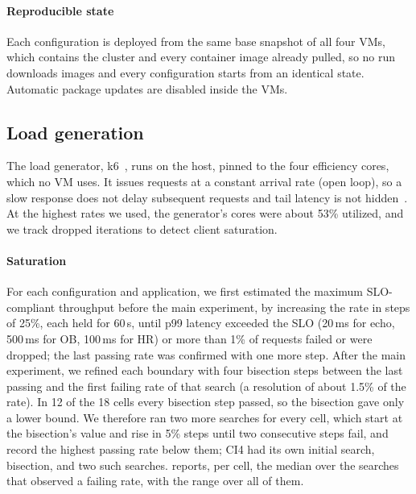 \paragraph{Reproducible state}
Each configuration is deployed from the same base snapshot of all four VMs,
which contains the cluster and every container image already pulled, so no run
downloads images and every configuration starts from an identical state.
Automatic package updates are disabled inside the VMs.

\subsection{Load generation}
\label{sec:load}

The load generator, k6~\cite{k6}, runs on the host, pinned to the four
efficiency cores, which no VM uses. It issues requests at a constant arrival
rate (open loop), so a slow response does not delay subsequent requests and
tail latency is not hidden~\cite{tene2015latency}. At the highest rates we
used, the generator's cores were about 53\% utilized, and we track dropped
iterations to detect client saturation.

\paragraph{Saturation}
For each configuration and application, we first estimated the maximum
SLO-compliant throughput before the main experiment, by increasing the rate in
steps of 25\%, each held for 60\,s, until p99 latency exceeded the SLO
(20\,ms for echo, 500\,ms for OB, 100\,ms for HR) or more than 1\% of
requests failed or were dropped; the last passing rate was confirmed with one
more step. After the main experiment, we refined each boundary with four
bisection steps between the last passing and the first failing rate of that
search (a resolution of about 1.5\% of the rate). In 12 of the 18 cells every
bisection step passed, so the bisection gave only a lower bound. We therefore
ran two more searches for every cell, which start at the bisection's value
and rise in 5\% steps until two consecutive steps fail, and record the highest
passing rate below them; CI4 had its own initial search, bisection, and two
such searches.  reports, per cell, the median over the searches
that observed a failing rate, with the range over all of them.

